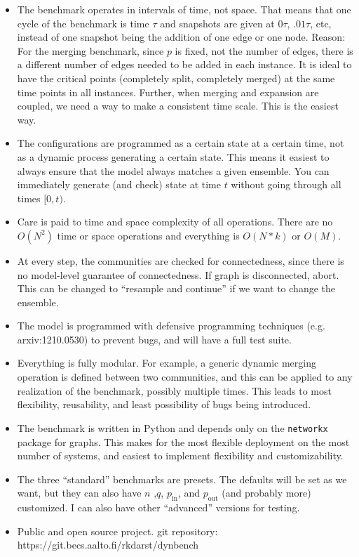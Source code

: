 \documentclass{article}
\def\pin{p_\mathrm{in}}
\def\pout{p_\mathrm{out}}
\begin{document}
\begin{itemize}
\item The benchmark operates in intervals of time, not space.  That
  means that one cycle of the benchmark is time $\tau$ and snapshots
  are given at $0\tau$, $.01\tau$, etc, instead of one snapshot being
  the addition of one edge or one node.  Reason: For the merging
  benchmark, since $p$ is fixed, not the number of edges, there is a
  different number of edges needed to be added in each instance.  It is ideal to have
  the critical points (completely split, completely merged) at the
  same time points in all instances.  Further, when merging and
  expansion are coupled, we need a way to make a consistent time
  scale.  This is the easiest way.
\item The configurations are programmed as a certain state at a certain
  time, not as a dynamic process generating a certain state.  This
  means it easiest to always ensure that the model always matches a
  given ensemble.  You can immediately generate (and check) state at
  time $t$ without going through all times $[0,t)$.
\item Care is paid to time and space complexity of all operations.
  There are no $O(N^2)$ time or space operations and everything is
  $O(N*k)$ or $O(M)$.
\item At every step, the communities are checked for connectedness,
  since there is no model-level guarantee of connectedness.  If graph
  is disconnected, abort.  This can be changed to ``resample and
  continue'' if we want to change the ensemble.
\item The model is programmed with defensive programming techniques
  (e.g. arxiv:1210.0530) to prevent bugs, and will have a full test suite.
\item Everything is fully modular.  For example, a generic dynamic merging operation is
  defined between two communities, and this can be applied to any
  realization of the benchmark, possibly multiple times.  This leads
  to most flexibility, reusability, and least possibility of bugs being introduced.
\item The benchmark is written in Python and depends only on the
  \texttt{networkx} package for graphs.  This makes for the most
  flexible deployment on the most number of systems, and easiest to
  implement flexibility and customizability.
\item The three ``standard'' benchmarks are presets.  The defaults
  will be set as we want, but they can also have $n$ ,$q$, $\pin$,
  and $\pout$ (and probably more) customized.  I can also have other
  ``advanced'' versions
  for testing.
\item Public and open source project.  git repository:
  https://git.becs.aalto.fi/rkdarst/dynbench
\end{itemize}
\end{document}
